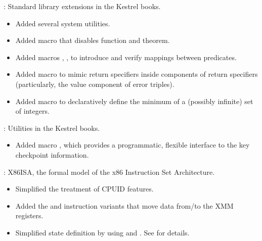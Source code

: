 
\begin{frame}

\implibtitle

:
Standard library extensions in the Kestrel books.
\begin{itemize}
\item Added several system utilities.
\item Added macro  that disables function and theorem.
\item Added macros , , 
      to introduce and verify mappings between predicates.
\item Added macro  to mimic  return specifiers
      inside components of  return specifiers
      (particularly, the value component of error triples).
\item Added macro  to declaratively define
      the minimum of a (possibly infinite) set of integers.
\end{itemize}

\end{frame}


\begin{frame}

\implibtitle

:
Utilities in the Kestrel books.
\begin{itemize}
\item Added macro ,
      which provides a programmatic, flexible interface
      to the key checkpoint information.
\end{itemize}

\end{frame}


\begin{frame}

\implibtitle

:
X86ISA, the formal model of the x86 Instruction Set Architecture.
\begin{itemize}
\item Simplified the treatment of CPUID features.
\item Added the  and  instruction variants
  that move data from/to the XMM registers.
\item Simplified state definition by using
       and . See
       for details.
\end{itemize}

\end{frame}

